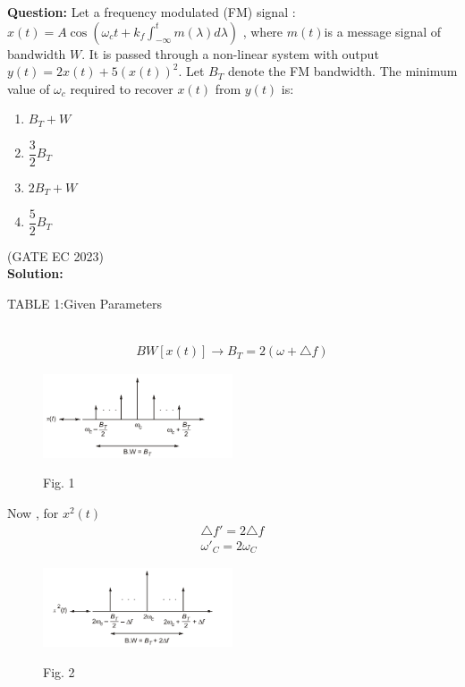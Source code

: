 \documentclass[journal,12pt,twocolumn]{IEEEtran}
\theoremstyle{remark}
\begin{document}
\textbf{Question:} Let a frequency modulated (FM) signal : $ x(t) = A \cos(\omega_c t + k_f \int_{-\infty}^{t} m(\lambda) d\lambda)$ , where $ m(t) $is a message signal of bandwidth $ W $. It is passed through a non-linear system with output $y(t) = 2x(t) + 5(x(t))^2 $.
Let $B_T $ denote the FM bandwidth. The minimum value of $ \omega_c $ required to recover $ x(t) $ from $ y(t) $ is:\\
\begin{enumerate}[label = (\Alph*)]
\item $B_T + W$ \\
\item $\dfrac{3}{2} B_T$ \\
\item $2B_T + W$ \\
\item $\dfrac{5}{2} B_T$ \\
\end{enumerate} \hfill{(GATE EC 2023)}\\
\textbf{Solution: }
\begin{table}[h!]
\centering
\resizebox{\columnwidth}{!}{
}
\label{cggattab1}
\caption*{ TABLE 1:Given Parameters}
\end{table}
\\
\begin{align}
BW[x(t)] \longrightarrow B_T = 2(\omega + \triangle f )
\end{align}
\begin{figure}[h!]
  \centering
  \includegraphics[width=0.5\textwidth]{figures/cggatefig1.png} 
 \label{cggatefig1}
 \caption*{Fig. 1}
\end{figure}

Now , for $x^{2}(t) $
\begin{align}
\triangle f' = 2\triangle f \\
\omega'_C = 2\omega_C
\end{align}

\begin{figure}[h!]
  \centering
  \includegraphics[width=0.5\textwidth]{figures/cggatefig2.png} 
 \label{cggatefig2}
  \caption*{Fig. 2}
\end{figure}
\end{document}
